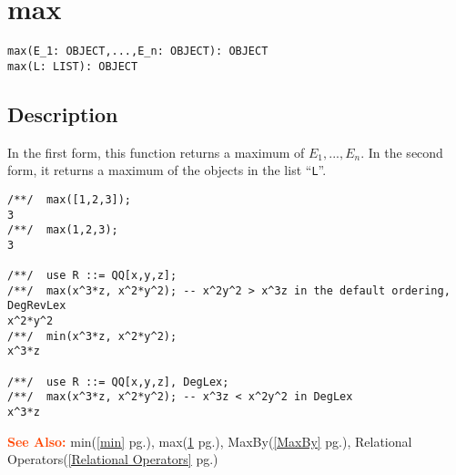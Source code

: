\documentclass[a4paper]{mybook}
\newenvironment{command}{}{} %
\newcommand\SeeAlso{\par\textcolor{OrangeRed}{\textbf{\large See Also: }}}
\begin{document}
\section{max}
\label{max}
\begin{command} %


\begin{Verbatim}[label=syntax, rulecolor=\color{MidnightBlue},
frame=single]
max(E_1: OBJECT,...,E_n: OBJECT): OBJECT
max(L: LIST): OBJECT
\end{Verbatim}


\subsection*{Description}

In the first form, this function returns a maximum of $E_1,...,E_n$.
In the second form, it returns a maximum of the objects in the list ``\verb&L&''.
\begin{Verbatim}[label=example, rulecolor=\color{PineGreen}, frame=single]
/**/  max([1,2,3]);
3
/**/  max(1,2,3);
3

/**/  use R ::= QQ[x,y,z];
/**/  max(x^3*z, x^2*y^2); -- x^2y^2 > x^3z in the default ordering, DegRevLex
x^2*y^2
/**/  min(x^3*z, x^2*y^2);
x^3*z

/**/  use R ::= QQ[x,y,z], DegLex;
/**/  max(x^3*z, x^2*y^2); -- x^3z < x^2y^2 in DegLex
x^3*z
\end{Verbatim}


\SeeAlso %
  min(\ref{min} pg.\pageref{min}), 
    max(\ref{max} pg.\pageref{max}), 
    MaxBy(\ref{MaxBy} pg.\pageref{MaxBy}), 
    Relational Operators(\ref{Relational Operators} pg.\pageref{Relational Operators})
\end{command} %
\end{document}

